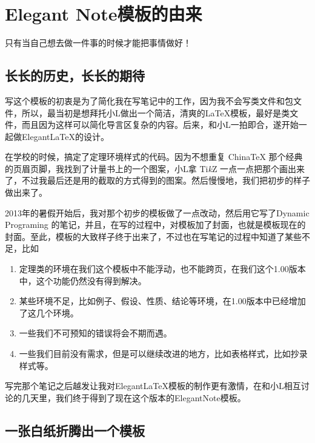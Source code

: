 \documentclass[cyan]{elegantnote}
\author{ddswhu \& 小L}
\begin{document}
\maketitle
\tableofcontents
\chapter{Elegant Note模板的由来}

只有当自己想去做一件事的时候才能把事情做好！

\section{长长的历史，长长的期待}

写这个模板的初衷是为了简化我在写笔记中的工作，因为我不会写类文件和包文件，所以，最当初是想拜托小L做出一个简洁，清爽的\LaTeX{}模板，最好是类文件，而且因为这样可以简化导言区复杂的内容。后来，和小L一拍即合，遂开始一起做Elegant\LaTeX{}的设计。

在学校的时候，搞定了定理环境样式的代码。因为不想重复 ChinaTeX 那个经典的页眉页脚，我找到了计量书上的一个图案，小L拿 Ti\emph{k}Z 一点一点把那个画出来了，不过我最后还是用的截取的方式得到的图案。然后慢慢地，我们把初步的样子做出来了。

2013年的暑假开始后，我对那个初步的模板做了一点改动，然后用它写了Dynamic Programing 的笔记，并且，在写的过程中，对模板加了封面，也就是模板现在的封面。至此，模板的大致样子终于出来了，不过也在写笔记的过程中知道了某些不足，比如
\begin{enumerate}
\item 定理类的环境在我们这个模板中不能浮动，也不能跨页，在我们这个1.00版本中，这个功能仍然没有得到解决。
\item 某些环境不足，比如例子、假设、性质、结论等环境，在1.00版本中已经增加了这几个环境。
\item 一些我们不可预知的错误将会不期而遇。
\item 一些我们目前没有需求，但是可以继续改进的地方，比如表格样式，比如抄录样式等。
\end{enumerate}

写完那个笔记之后越发让我对Elegant\LaTeX{}模板的制作更有激情，在和小L相互讨论的几天里，我们终于得到了现在这个版本的ElegantNote模板。




\section{一张白纸折腾出一个模板}
\end{document}
